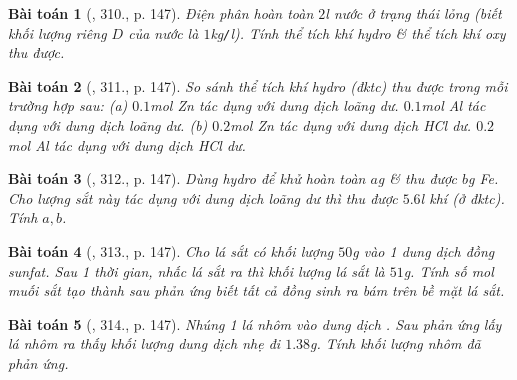 \documentclass{article}
\newtheorem{baitoan}{Bài toán}
\begin{document}
\begin{baitoan}[\cite{An_400_BT_Hoa_Hoc_8_2020}, 310., p. 147]
	Điện phân hoàn toàn $2$\emph{l} nước ở trạng thái lỏng (biết khối lượng riêng $D$ của nước là $1$\emph{kg\texttt{/}l}). Tính thể tích khí hydro \& thể tích khí oxy thu được.
\end{baitoan}

\begin{baitoan}[\cite{An_400_BT_Hoa_Hoc_8_2020}, 311., p. 147]
	So sánh thể tích khí hydro (đktc) thu được trong mỗi trường hợp sau: (a) $0.1$\emph{mol Zn} tác dụng với dung dịch \emph{} loãng dư. $0.1$\emph{mol Al} tác dụng với dung dịch \emph{} loãng dư. (b) $0.2$\emph{mol Zn} tác dụng với dung dịch \emph{HCl} dư. $0.2$\emph{mol Al} tác dụng với dung dịch \emph{HCl} dư.
\end{baitoan}

\begin{baitoan}[\cite{An_400_BT_Hoa_Hoc_8_2020}, 312., p. 147]
	Dùng hydro để khử hoàn toàn $a$\emph{g} \emph{} \& thu được $b$\emph{g Fe}. Cho lượng sắt này tác dụng với dung dịch \emph{} loãng dư thì thu được $5.6$\emph{l} khí \emph{} (ở đktc). Tính $a,b$.
\end{baitoan}

\begin{baitoan}[\cite{An_400_BT_Hoa_Hoc_8_2020}, 313., p. 147]
	Cho lá sắt có khối lượng $50$\emph{g} vào 1 dung dịch đồng sunfat. Sau 1 thời gian, nhấc lá sắt ra thì khối lượng lá sắt là $51$\emph{g}. Tính số \emph{mol} muối sắt tạo thành sau phản ứng biết tất cả đồng sinh ra bám trên bề mặt lá sắt.
\end{baitoan}

\begin{baitoan}[\cite{An_400_BT_Hoa_Hoc_8_2020}, 314., p. 147]
	Nhúng 1 lá nhôm vào dung dịch \emph{}. Sau phản ứng lấy lá nhôm ra thấy khối lượng dung dịch nhẹ đi $1.38$\emph{g}. Tính khối lượng nhôm đã phản ứng.
\end{baitoan}

\end{document}
